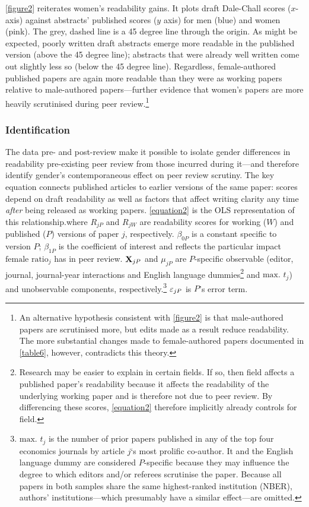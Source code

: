 

\autoref{figure2} reiterates women's readability gains. It plots draft Dale-Chall scores ($x$-axis) against abstracts' published scores ($y$ axis) for men (blue) and women (pink). The grey, dashed line is a 45 degree line through the origin. As might be expected, poorly written draft abstracts emerge more readable in the published version (above the 45 degree line); abstracts that were already well written come out slightly less so (below the 45 degree line). Regardless, female-authored published papers are again more readable than they were as working papers relative to male-authored papers---further evidence that women's papers are more heavily scrutinised during peer review.\footnote{An alternative hypothesis consistent with \autoref{figure2} is that male-authored papers are scrutinised more, but edits made as a result reduce readability. The more substantial changes made to female-authored papers documented in \autoref{table6}, however, contradicts this theory.} 

\subsubsection{Identification}
\label{nberidentification}

The data pre- and post-review make it possible to isolate gender differences in readability pre-existing peer review from those incurred during it---and therefore identify gender's contemporaneous effect on peer review scrutiny. The key equation connects published articles to earlier versions of the same paper: scores depend on draft readability as well as factors that affect writing clarity any time \emph{after} being released as working papers. \autoref{equation2} is the OLS representation of this relationship.where $R_{jP}$ and $R_{jW}$ are readability scores for working ($W$) and published ($P$) versions of paper $j$, respectively. $\beta_{0P}$ is a constant specific to version $P$; $\beta_{1P}$ is the coefficient of interest and reflects the particular impact $\text{female ratio}_j$ has in peer review. $\mathbf{X}_{jP}$ and $\mu_{jP}$ are $P$-specific observable (editor, journal, journal-year interactions and English language dummies\footnote{\label{Footnote121}Research may be easier to explain in certain fields. If so, then field affects a published paper's readability because it affects the readability of the underlying working paper and is therefore not due to peer review. By differencing these scores, \autoref{equation2} therefore implicitly already controls for field.} and $\text{max. }t_j$) and unobservable components, respectively.\footnote{\label{Footnote46}$\text{max. }t_j$ is the number of prior papers published in any of the top four economics journals by article $j$`s most prolific co-author. It and the English language dummy are considered $P$-specific because they may influence the degree to which editors and\slash or referees scrutinise the paper. Because all papers in both samples share the same highest-ranked institution (NBER), authors' institutions---which presumably have a similar effect---are omitted.} $\varepsilon_{jP}$ is $P$'s error term.

